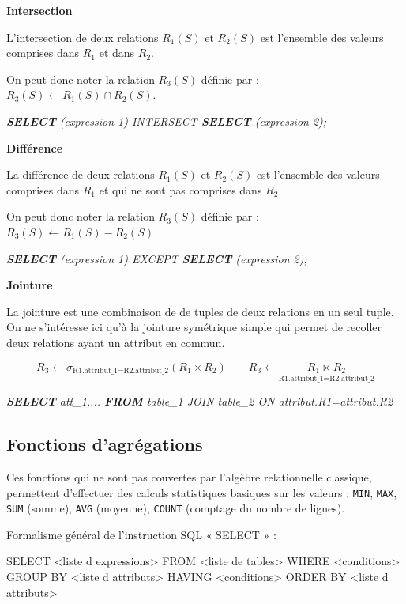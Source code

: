 \documentclass[10pt,fleqn]{article} %
\begin{document}
\begin{defi}

\textbf{Intersection}

L'intersection de deux relations $R_1(S)$ et $R_2(S)$ est l'ensemble des valeurs comprises dans $R_1$ et dans $R_2$. 

On peut donc noter la relation $R_3(S)$ définie par : $R_3(S)\leftarrow R_1(S)\cap R_2(S)$.

\textsl{\textbf{SELECT}  (expression 1) INTERSECT \textbf{SELECT} (expression 2);}
\end{defi}

\begin{defi}

\textbf{Différence}

La différence de deux relations $R_1(S)$ et $R_2(S)$ est l'ensemble des valeurs comprises dans $R_1$ et qui ne sont pas comprises dans $R_2$. 

On peut donc noter la relation $R_3(S)$ définie par : $R_3(S)\leftarrow R_1(S)-R_2(S)$

\textsl{\textbf{SELECT}  (expression 1) EXCEPT \textbf{SELECT} (expression 2);}

\end{defi}


\begin{defi}

\textbf{Jointure}

La jointure est une combinaison de de tuples de deux relations en un seul tuple. On ne s'intéresse ici qu'à la jointure symétrique simple qui permet de recoller deux relations ayant un attribut en commun. 

$$ 
R_3 \leftarrow \sigma_{\text{R1.attribut\_1=R2.attribut\_2}} (R_1\times R_2) \quad \quad 
R_3 \leftarrow \underset{\text{R1.attribut\_1=R2.attribut\_2}}{R_1 \bowtie R_2}
$$

\textsl{\textbf{SELECT} att\_1,... \textbf{FROM} table\_1 JOIN table\_2 ON attribut.R1=attribut.R2}
\end{defi}




\subsection*{Fonctions d'agrégations}
\begin{defi}
Ces fonctions qui ne sont pas couvertes par l’algèbre relationnelle 
classique, permettent d’effectuer des calculs statistiques basiques sur les valeurs : \texttt{MIN}, \texttt{MAX}, \texttt{SUM} 
(somme), \texttt{AVG} (moyenne), \texttt{COUNT} (comptage du nombre de lignes). 
\end{defi}

Formalisme général de l’instruction SQL « SELECT » :
\begin{envsql}
\begin{sql}
SELECT <liste d expressions> 
    FROM <liste de tables> 
    WHERE <conditions> 
    GROUP BY <liste d attributs> 
    HAVING <conditions> 
    ORDER BY <liste d attributs> 
\end{sql}
\end{envsql}
\end{document}
